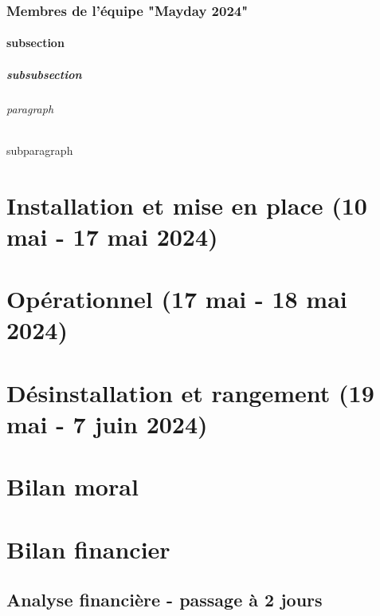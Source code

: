\documentclass[12pt,a4paper]{report}
\begin{document}
\section{Membres de l'équipe "Mayday 2024"}

\subsection{subsection}
\subsubsection{subsubsection}
\paragraph{paragraph}
\subparagraph{subparagraph}

\part{Installation et mise en place (10 mai - 17 mai 2024)}

\part{Opérationnel (17 mai - 18 mai 2024)}

\part{Désinstallation et rangement (19 mai - 7 juin 2024)}

\part{Bilan moral}

\part{Bilan financier}
\chapter{Analyse financière - passage à 2 jours}
\end{document}
